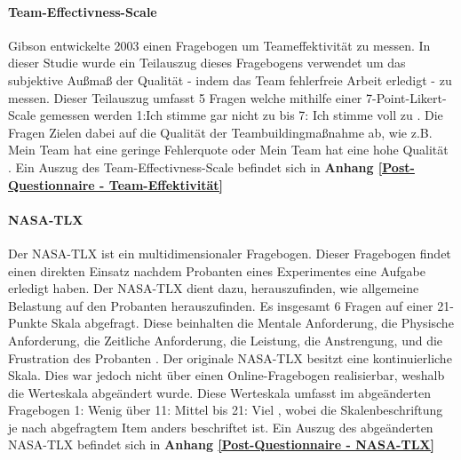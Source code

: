 \documentclass[a4paper,11pt]{article}%
\renewcommand{\\}{\vspace*{0.5\baselineskip} \newline}
\begin{document}
		\paragraph{Team-Effectivness-Scale}
Gibson \citep[p.469]{gibson2003team} entwickelte 2003 einen Fragebogen um Teameffektivität zu messen. In dieser Studie wurde ein Teilauszug dieses Fragebogens verwendet um das subjektive Außmaß der Qualität - indem das Team fehlerfreie Arbeit erledigt - zu messen. Dieser Teilauszug umfasst 5 Fragen welche mithilfe einer 7-Point-Likert-Scale gemessen werden \dq{}1:Ich stimme gar nicht zu \dq{} bis \dq{}7: Ich stimme voll zu \dq{}. Die Fragen Zielen dabei auf die Qualität der Teambuildingmaßnahme ab, wie z.B. \dq{}Mein Team hat eine geringe Fehlerquote \dq{} oder \dq{}Mein Team hat eine hohe Qualität \dq{}. 
Ein Auszug des Team-Effectivness-Scale befindet sich in \textbf{Anhang \ref{Post-Questionnaire - Team-Effektivität}}


		\paragraph{NASA-TLX}
Der NASA-TLX ist ein multidimensionaler Fragebogen. Dieser Fragebogen findet einen direkten Einsatz nachdem Probanten eines Experimentes eine Aufgabe erledigt haben. Der NASA-TLX dient dazu, herauszufinden, wie allgemeine Belastung auf den Probanten herauszufinden.
Es insgesamt 6 Fragen auf einer 21-Punkte Skala abgefragt. Diese beinhalten die Mentale Anforderung, die Physische Anforderung, die Zeitliche Anforderung, die Leistung, die Anstrengung, und die Frustration des Probanten \cite{NASATLX}.
Der originale NASA-TLX besitzt eine kontinuierliche Skala. Dies war jedoch nicht über einen Online-Fragebogen realisierbar, weshalb die Werteskala abgeändert wurde. Diese Werteskala umfasst im abgeänderten Fragebogen \dq{}1: Wenig \dq{} über \dq{}11: Mittel \dq{} bis \dq{}21: Viel \dq{}, wobei die Skalenbeschriftung je nach abgefragtem Item anders beschriftet ist.
Ein Auszug des abgeänderten NASA-TLX befindet sich in \textbf{Anhang \ref{Post-Questionnaire - NASA-TLX}}
\end{document}
